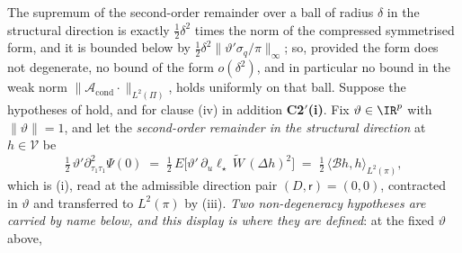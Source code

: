 \begin{proposition}\label{prp:sharpquad}
The supremum of the second-order remainder over a ball of radius $\delta$ in the structural direction is
exactly $\tfrac12\delta^{2}$ times the norm of the compressed symmetrised form, and it is bounded below by
$\tfrac12\delta^{2}\|\vartheta'\sigma_q/\pi\|_\infty$; so, provided the form does not degenerate, no bound
of the form $o(\delta^{2})$, and in particular no bound in the weak norm
$\|\mathcal A_{\mathrm{cond}}\cdot\|_{L^{2}(\Pi)}$, holds uniformly on that ball.
Suppose the hypotheses of  hold, and for clause \textup{(iv)} in addition
\textbf{C2$'$(i)}. Fix $\vartheta\in\IR^{p}$ with $\|\vartheta\|=1$,
and let the \emph{second-order remainder in the structural direction} at $h\in\mathcal V$ be
\begin{equation}\label{eq:quadrem}
\tfrac12\,\vartheta'\partial^{2}_{\tau_1\tau_1}\Psi(0)
\;=\;\tfrac12\,E\big[\vartheta'\,\partial_u\ell_\star\,\widetilde W\,(\Delta h)^{2}\big]
\;=\;\tfrac12\,\big\langle\mathcal Bh,h\big\rangle_{L^{2}(\pi)} ,
\end{equation}
which is \textup{(i)}, read at the admissible direction pair
$(D,\mathsf r)=(0,0)$, contracted in $\vartheta$ and transferred to $L^{2}(\pi)$ by
\textup{(iii)}.
\emph{Two non-degeneracy hypotheses are carried by name below, and this display is where they are
defined}: at the fixed $\vartheta$ above,

\end{proposition}

